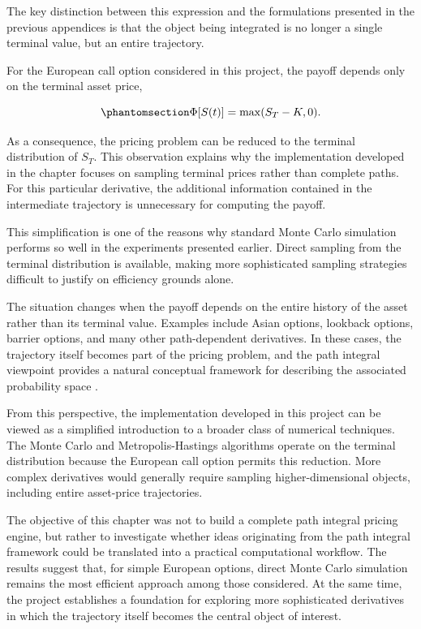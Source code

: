 \documentclass[
  12pt,
  letterpaper,
]{book}
\begin{document}
The key distinction between this expression and the formulations
presented in the previous appendices is that the object being integrated
is no longer a single terminal value, but an entire trajectory.

For the European call option considered in this project, the payoff
depends only on the terminal asset price,

\begin{equation}\phantomsection\label{eq-european-payoff}{
\Phi[S(t)]
=
\max(S_T-K,0).
}\end{equation}

As a consequence, the pricing problem can be reduced to the terminal
distribution of \(S_T\). This observation explains why the
implementation developed in the chapter focuses on sampling terminal
prices rather than complete paths. For this particular derivative, the
additional information contained in the intermediate trajectory is
unnecessary for computing the payoff.

This simplification is one of the reasons why standard Monte Carlo
simulation performs so well in the experiments presented earlier. Direct
sampling from the terminal distribution is available, making more
sophisticated sampling strategies difficult to justify on efficiency
grounds alone.

The situation changes when the payoff depends on the entire history of
the asset rather than its terminal value. Examples include Asian
options, lookback options, barrier options, and many other
path-dependent derivatives. In these cases, the trajectory itself
becomes part of the pricing problem, and the path integral viewpoint
provides a natural conceptual framework for describing the associated
probability space 
.

From this perspective, the implementation developed in this project can
be viewed as a simplified introduction to a broader class of numerical
techniques. The Monte Carlo and Metropolis-Hastings algorithms operate
on the terminal distribution because the European call option permits
this reduction. More complex derivatives would generally require
sampling higher-dimensional objects, including entire asset-price
trajectories.

The objective of this chapter was not to build a complete path integral
pricing engine, but rather to investigate whether ideas originating from
the path integral framework could be translated into a practical
computational workflow. The results suggest that, for simple European
options, direct Monte Carlo simulation remains the most efficient
approach among those considered. At the same time, the project
establishes a foundation for exploring more sophisticated derivatives in
which the trajectory itself becomes the central object of interest.
\end{document}

